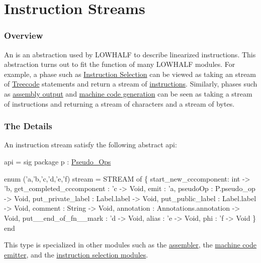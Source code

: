\section{Instruction Streams}

\subsubsection{Overview}
An 
is an abstraction used by LOWHALF to describe linearized instructions.
This abstraction turns out to fit the function of
many LOWHALF modules.  For example,
a phase such as \href{instrsel.html}{Instruction Selection} 
can be viewed as taking an stream of 
\href{treecode.html}{Treecode} statements and return a
stream of \href{instructions.html}{instructions}.  Similarly,
phases such as \href{asm.html}{assembly output} and
\href{mc.html}{machine code generation} can be seen 
as taking a stream of instructions and 
returning a stream of characters and a stream of bytes.

\subsubsection{The Details}
An instruction stream satisfy the following abstract api:
\begin{SML}
api  =
sig
   package p : \href{pseudo-ops.html}{Pseudo_Ops}

   enum ('a,'b,'c,'d,'e,'f) stream =
      STREAM of
      \{ start_new_cccomponent: int -> 'b,  
        get_completed_cccomponent  : 'c -> Void, 
        emit        : 'a,        
        pseudoOp    : P.pseudo_op -> Void,
        put_private_label : Label.label -> Void,
        put_public_label  : Label.label -> Void,
        comment     : String -> Void,    
        annotation  : Annotations.annotation -> Void,
        put__end_of_fn__mark   : 'd -> Void,
        alias       : 'e -> Void, 
        phi         : 'f -> Void  
      \}
end
\end{SML}
This type is specialized in other modules such as the
\href{asm.html}{assembler}, the \href{mc.html}{machine code emitter},
and the \href{instrsel.html}{instruction selection modules}.
